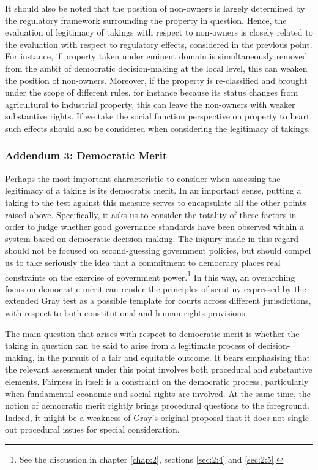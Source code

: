 It should also be noted that the position of non-owners is largely determined by the regulatory framework surrounding the property in question. Hence, the evaluation of legitimacy of takings with respect to non-owners is closely related to the evaluation with respect to regulatory effects, considered in the previous point. For instance, if property taken under eminent domain is simultaneously removed from the ambit of democratic decision-making at the local level, this can weaken the position of non-owners. Moreover, if the property is re-classified and brought under the scope of different rules, for instance because its status changes from agricultural to industrial property, this can leave the non-owners with weaker substantive rights. If we take the social function perspective on property to heart, such effects should also be considered when considering the legitimacy of takings.

\subsubsection*{Addendum 3: Democratic Merit}

Perhaps the most important characteristic to consider when assessing the legitimacy of a taking is its democratic merit. In an important sense, putting a taking to the test against this measure serves to encapsulate all the other points raised above. Specifically, it asks us to consider the totality of these factors in order to judge whether good governance standards have been observed within a system based on democratic decision-making. The inquiry made in this regard should not be focused on second-guessing government policies, but should compel us to take seriously the idea that a commitment to democracy places real constraints on the exercise of government power.\footnote{See the discussion in chapter \ref{chap:2}, sections \ref{sec:2:4} and \ref{sec:2:5}.} In this way, an overarching focus on democratic merit can render the principles of scrutiny expressed by the extended Gray test as a possible template for courts across different jurisdictions, with respect to both constitutional and human rights provisions.

The main question that arises with respect to democratic merit is whether the taking in question 
can be said to arise from a legitimate process of decision-making, in the pursuit of a fair and equitable outcome. It bears emphasising that the relevant assessment under this point involves both procedural and substantive elements. Fairness in itself is a constraint on the democratic process, particularly when fundamental economic and social rights are involved. At the same time, the notion of democratic merit rightly brings procedural questions to the foreground. Indeed, it might be a weakness of Gray's original proposal that it does not single out procedural issues for special consideration.

